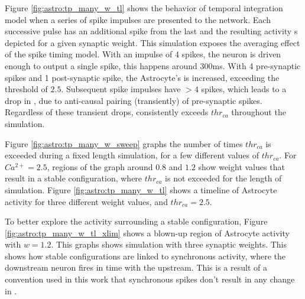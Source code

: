 Figure \ref{fig:astro:tp_many_w_tl} shows the behavior of temporal
integration model when a series of spike impulses are presented to the
network. Each successive pulse has an additional spike from the last and the
resulting \ca activity s depicted for a given synaptic weight. This simulation
exposes the averaging effect of the spike timing model. With an impulse of 4
spikes, the neuron is driven enough to output a single spike, this happens around
300ms. With 4 pre-synaptic spikes and 1 post-synaptic spike, the Astrocyte's
\ca is increased, exceeding the threshold of $2.5$. Subsequent spike impulses
have $>4$ spikes, which leads to a drop in \ca, due to anti-causal pairing
(transiently) of pre-synaptic spikes. Regardless of these transient drops, \ca
consistently exceeds $thr_{ca}$ throughout the simulation.


Figure \ref{fig:astro:tp_many_w_sweep} graphs the number of times $thr_{ca}$ is
exceeded during a fixed length simulation, for a few different values of
$thr_{ca}$. For $Ca^{2+}=2.5$, regions of the graph around $0.8$ and $1.2$ show
weight values that result in a stable configuration, where $thr_{ca}$ is not
exceeded for the length of simulation. Figure \ref{fig:astro:tp_many_w_tl} shows
a timeline of Astrocyte activity for three different weight values, and
$thr_{ca}=2.5$.




To better explore the activity surrounding a stable configuration, Figure
\ref{fig:astro:tp_many_w_tl_xlim} shows a blown-up region of Astrocyte activity
with $w=1.2$. This graphs shows simulation with three synaptic weights. This
shows how stable configurations are linked to synchronous activity, where the
downstream neuron fires in time with the upstream. This is a result of a
convention used in this work that synchronous spikes don't result in any change
in \ca.


